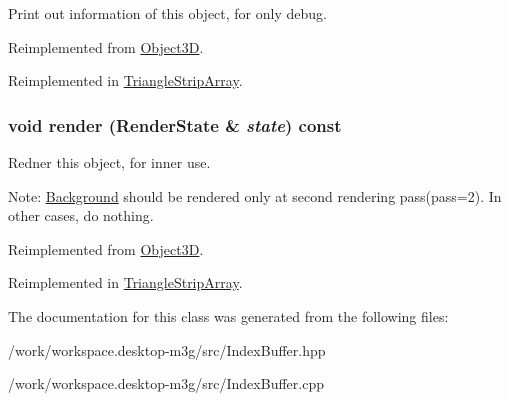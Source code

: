 Print out information of this object, for only debug. 

Reimplemented from \hyperlink{classm3g_1_1Object3D_6fea17fa1532df3794f8cb39cb4f911f}{Object3D}.

Reimplemented in \hyperlink{classm3g_1_1TriangleStripArray_6fea17fa1532df3794f8cb39cb4f911f}{TriangleStripArray}.\hypertarget{classm3g_1_1IndexBuffer_8babc8a79b78615da51161e94029eea9}{
\subsubsection[{render}]{\setlength{\rightskip}{0pt plus 5cm}void render ({\bf RenderState} \& {\em state}) const}}
\label{classm3g_1_1IndexBuffer_8babc8a79b78615da51161e94029eea9}


Redner this object, for inner use.

Note: \hyperlink{classm3g_1_1Background}{Background} should be rendered only at second rendering pass(pass=2). In other cases, do nothing. 

Reimplemented from \hyperlink{classm3g_1_1Object3D_8babc8a79b78615da51161e94029eea9}{Object3D}.

Reimplemented in \hyperlink{classm3g_1_1TriangleStripArray_8babc8a79b78615da51161e94029eea9}{TriangleStripArray}.

The documentation for this class was generated from the following files:\begin{CompactItemize}
\item 
/work/workspace.desktop-m3g/src/IndexBuffer.hpp\item 
/work/workspace.desktop-m3g/src/IndexBuffer.cpp\end{CompactItemize}
